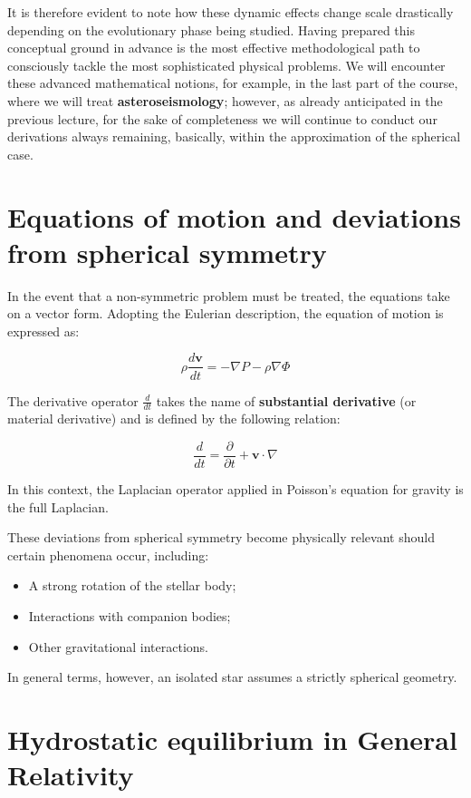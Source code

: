 It is therefore evident to note how these dynamic effects change scale drastically depending on the evolutionary phase being studied. Having prepared this conceptual ground in advance is the most effective methodological path to consciously tackle the most sophisticated physical problems. We will encounter these advanced mathematical notions, for example, in the last part of the course, where we will treat \textbf{asteroseismology}; however, as already anticipated in the previous lecture, for the sake of completeness we will continue to conduct our derivations always remaining, basically, within the approximation of the spherical case.

\section{Equations of motion and deviations from spherical symmetry}

In the event that a non-symmetric problem must be treated, the equations take on a vector form. Adopting the Eulerian description, the equation of motion is expressed as:

\begin{equation}
\rho \frac{d\mathbf{v}}{dt} = -\nabla P - \rho \nabla \Phi
\end{equation}

The derivative operator $\frac{d}{dt}$ takes the name of \textbf{substantial derivative} (or material derivative) and is defined by the following relation:

\begin{equation}
\frac{d}{dt} = \frac{\partial}{\partial t} + \mathbf{v} \cdot \nabla
\end{equation}

In this context, the Laplacian operator applied in Poisson's equation for gravity is the full Laplacian.

These deviations from spherical symmetry become physically relevant should certain phenomena occur, including:
\begin{itemize}
\item A strong rotation of the stellar body;
\item Interactions with companion bodies;
\item Other gravitational interactions.
\end{itemize}
In general terms, however, an isolated star assumes a strictly spherical geometry.

\section{Hydrostatic equilibrium in General Relativity}

